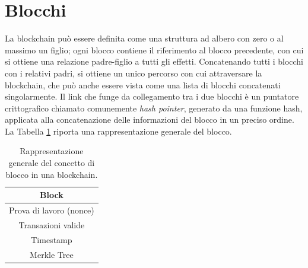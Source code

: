 \section{Blocchi}
\label{sec:blocchiBlockchain}

La blockchain può essere definita come una struttura ad albero con zero o al massimo un figlio; ogni blocco contiene il riferimento al blocco precedente, con cui si ottiene una relazione padre-figlio a tutti gli effetti.
Concatenando tutti i blocchi con i relativi padri, si ottiene un unico percorso con cui attraversare la blockchain, che può anche essere vista come una lista di blocchi concatenati singolarmente.
Il link che funge da collegamento tra i due blocchi è un puntatore crittografico chiamato comunemente {\it hash pointer\/}, generato da una funzione hash, applicata alla concatenazione delle informazioni del blocco in un preciso ordine. La Tabella \ref{tab:bitcoinblock} riporta una rappresentazione generale del blocco.


\begin{table}[ht]
       \centering\small
           \begin{tabular}{|c|}
               \hline
               \textbf{Block}\\
               \hline \hline
               Prova di lavoro (nonce)   \\
               \hline
               Transazioni valide \\
               \hline
               Timestamp \\
               \hline
               Merkle Tree \\
               \hline
       \end{tabular}
       \caption{Rappresentazione generale del concetto di blocco in una blockchain.\label{tab:bitcoinblock}}
   \end{table}
   


